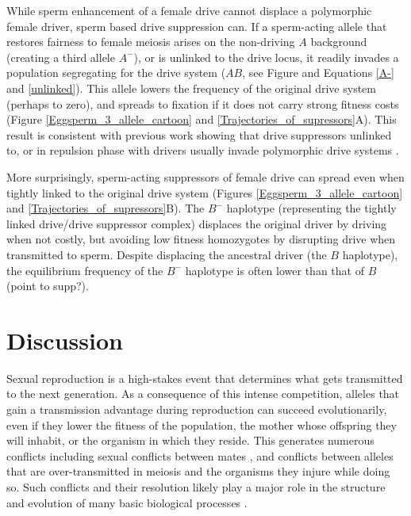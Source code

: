 \documentclass[12pt,letterpaper]{article}
\newcommand{\gc}[1]{{ \color{red} #1}}
\newcommand{\yb}[1]{{ \color{blue} #1}}
\begin{document}
While  sperm enhancement of a female drive cannot displace a polymorphic female driver, sperm based drive suppression can. 
If a sperm-acting allele that restores fairness to female meiosis arises on
	the non-driving $A$ background (creating a third allele $A^{-}$), 
	or is unlinked to the drive locus, it readily invades a population segregating
	for the drive system ($AB$, see Figure and Equations \ref{A-} and \ref{unlinked}).  
This allele lowers the frequency of the original drive system (perhaps to zero),
	and spreads to fixation if it does not carry strong fitness costs
	(Figure \ref{Eggsperm_3_allele_cartoon} and \ref{Trajectories_of_supressors}A). 
This result is consistent with previous work showing that drive suppressors unlinked to, or in repulsion phase with drivers usually invade polymorphic drive systems \citep[e.g. ][]{Brandvain2012}.  

More surprisingly, sperm-acting suppressors of female drive can spread
	even when tightly linked to the original drive system (Figures \ref{Eggsperm_3_allele_cartoon} and \ref{Trajectories_of_supressors}B). 
The $B^{-}$ haplotype (representing the tightly linked drive/drive suppressor complex) displaces the original driver 
	by driving when not costly, but avoiding low fitness homozygotes by disrupting drive when transmitted to sperm. %
Despite displacing the ancestral driver (the $B$ haplotype), the equilibrium frequency of the $B^-$ haplotype is often lower than that of $B$ \yb{(point to supp?)}. 


\section*{Discussion}

Sexual reproduction is a high-stakes event that determines what gets transmitted to the next generation.  
As a consequence of this intense competition, alleles that gain a transmission advantage during reproduction 
	can succeed evolutionarily, even if they lower the 
        fitness of the population, 
	the mother whose offspring they will inhabit, 
	or the organism in which they reside. 
This generates numerous conflicts  \cite{Burt2006} including sexual conflicts between mates \cite{Arnqvist2005}, 
	and conflicts between alleles that are over-transmitted in meiosis and the organisms they injure while doing so. 
Such conflicts and their resolution likely play a major role in the structure and evolution of many basic biological processes \citep{Rice2013}.
\end{document}

